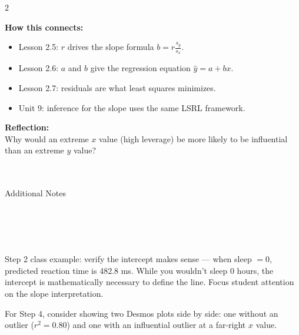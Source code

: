 \documentclass[10pt]{article}
\begin{document}
\begin{spiralbox}
\small
\begin{multicols}{2}

\textbf{How this connects:}
\begin{itemize}[itemsep=3pt]
  \item Lesson 2.5: $r$ drives the slope formula $b = r\frac{s_y}{s_x}$.
  \item Lesson 2.6: $a$ and $b$ give the regression equation $\hat{y} = a + bx$.
  \item Lesson 2.7: residuals are what least squares minimizes.
  \item Unit 9: inference for the slope uses the same LSRL framework.
\end{itemize}

\columnbreak

\textbf{Reflection:}\\
Why would an extreme $x$ value (high leverage) be more likely to be influential than an
extreme $y$ value?\\[2pt]
\\[1pt]
\\[1pt]

\end{multicols}
\end{spiralbox}

\vspace{0.1in}

\begin{notesbox}{Additional Notes}
\vspace{0pt}
\writeline\\\writeline\\\writeline\\\writeline\\\writeline\\\writeline
\end{notesbox}

\begin{teachernote}
Step 2 class example: verify the intercept makes sense --- when sleep $= 0$, predicted
reaction time is 482.8 ms. While you wouldn't sleep 0 hours, the intercept is mathematically
necessary to define the line. Focus student attention on the slope interpretation.

For Step 4, consider showing two Desmos plots side by side: one without an outlier
($r^2 = 0.80$) and one with an influential outlier at a far-right $x$ value.
\end{teachernote}
\end{document}
